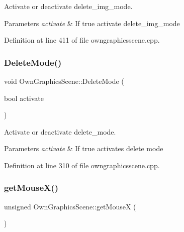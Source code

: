 Activate or deactivate delete\+\_\+img\+\_\+mode. 


\begin{DoxyParams}{Parameters}
{\em activate} & If true activate delete\+\_\+img\+\_\+mode \\
\hline
\end{DoxyParams}


Definition at line 411 of file owngraphicsscene.\+cpp.

\mbox{\label{classOwnGraphicsScene_aca454942ecf6c472d020e063862464d4}} 
\subsubsection{\texorpdfstring{Delete\+Mode()}{DeleteMode()}}
{\footnotesize\ttfamily void Own\+Graphics\+Scene\+::\+Delete\+Mode (\begin{DoxyParamCaption}\item[{bool}]{activate }\end{DoxyParamCaption})}



Activate or deactivate delete\+\_\+mode. 


\begin{DoxyParams}{Parameters}
{\em activate} & If true activates delete mode \\
\hline
\end{DoxyParams}


Definition at line 310 of file owngraphicsscene.\+cpp.

\mbox{\label{classOwnGraphicsScene_a6e54bd43db758bcd4f7cc1dd4544232e}} 
\subsubsection{\texorpdfstring{get\+Mouse\+X()}{getMouseX()}}
{\footnotesize\ttfamily unsigned Own\+Graphics\+Scene\+::get\+MouseX (\begin{DoxyParamCaption}{ }\end{DoxyParamCaption})\hspace{0.3cm}{\ttfamily [inline]}}



